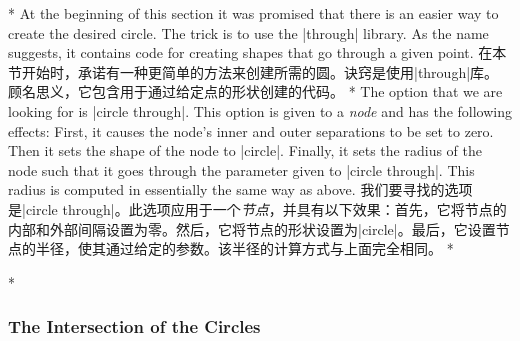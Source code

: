 \begin{paracol}{2}
\begin{codeexample}[preamble={\usetikzlibrary{calc}}]
\end{codeexample}
\switchcolumn[0]*%
At the beginning of this section it was promised that there is an easier way to
create the desired circle. The trick is to use the |through| library. As the
name suggests, it contains code for creating shapes that go through a given
point.
\switchcolumn
在本节开始时，承诺有一种更简单的方法来创建所需的圆。诀窍是使用|through|库。顾名思义，它包含用于通过给定点的形状创建的代码。
\switchcolumn[0]*%
The option that we are looking for is |circle through|. This option is given to
a \emph{node} and has the following effects: First, it causes the node's inner
and outer separations to be set to zero. Then it sets the shape of the node to
|circle|. Finally, it sets the radius of the node such that it goes through the
parameter given to |circle through|. This radius is computed in essentially the
same way as above.
\switchcolumn
我们要寻找的选项是|circle through|。此选项应用于一个\emph{节点}，并具有以下效果：首先，它将节点的内部和外部间隔设置为零。然后，它将节点的形状设置为|circle|。最后，它设置节点的半径，使其通过给定的参数。该半径的计算方式与上面完全相同。
\switchcolumn[1]*%
\begin{codeexample}[preamble={\usetikzlibrary{through}}]
\end{codeexample}


\switchcolumn[0]*%
\subsubsection{The Intersection of the Circles}
\switchcolumn

\end{paracol}
